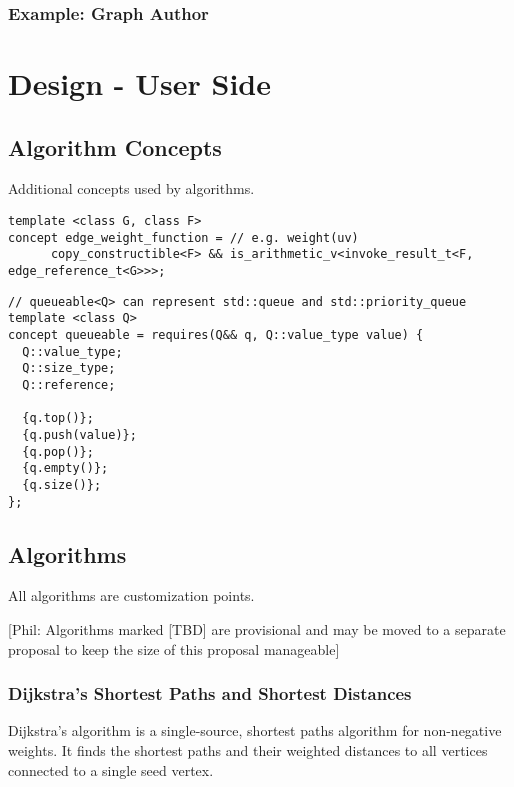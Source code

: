 \documentclass[10pt,onecolumn]{article}
\newcommand{\comment}[2]{{\color{comment}[{\sc #1:} \textsf{#2}]}}
\newcommand{\phil}[1]{\comment{Phil}{#1}}
\begin{document}
\subsubsection{Example: Graph Author}

\section{Design - User Side}
\subsection{Algorithm Concepts}
Additional concepts used by algorithms.
\begin{lstlisting}
template <class G, class F>
concept edge_weight_function = // e.g. weight(uv)
      copy_constructible<F> && is_arithmetic_v<invoke_result_t<F, edge_reference_t<G>>>;
\end{lstlisting}

\begin{lstlisting}
// queueable<Q> can represent std::queue and std::priority_queue
template <class Q>
concept queueable = requires(Q&& q, Q::value_type value) {
  Q::value_type;
  Q::size_type;
  Q::reference;

  {q.top()};
  {q.push(value)};
  {q.pop()};
  {q.empty()};
  {q.size()};
};
\end{lstlisting}


\subsection{Algorithms}
All algorithms are customization points.

\phil{Algorithms marked [TBD] are provisional and may be moved to a separate proposal to keep the size of this proposal manageable}

\subsubsection{Dijkstra's Shortest Paths and Shortest Distances}
Dijkstra's algorithm \cite{REF_} is a single-source, shortest paths algorithm for non-negative weights. It finds the shortest paths 
and their weighted distances to all vertices connected to a single seed vertex.
\end{document}

